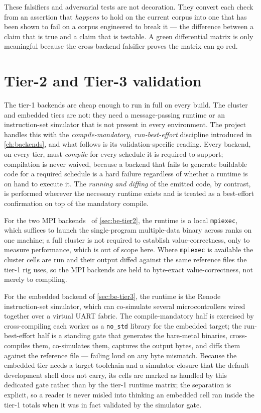 These falsifiers and adversarial tests are not decoration. They convert each check
from an assertion that \emph{happens} to hold on the current corpus into one that
has been shown to fail on a corpus engineered to break it --- the difference between
a claim that is true and a claim that is testable. A green differential matrix is
only meaningful because the cross-backend falsifier proves the matrix can go red.

\section{Tier-2 and Tier-3 validation}\label{sec:val-tiers}

The tier-1 backends are cheap enough to run in full on every build. The cluster and
embedded tiers are not: they need a message-passing runtime or an
instruction-set simulator that is not present in every environment. The project
handles this with the \emph{compile-mandatory, run-best-effort} discipline introduced
in \cref{ch:backends}, and what follows is its validation-specific reading.
Every backend, on every tier, must \emph{compile} for every schedule it is required
to support; compilation is never waived, because a backend that fails to generate
buildable code for a required schedule is a hard failure regardless of whether a
runtime is on hand to execute it. The \emph{running and diffing} of the emitted
code, by contrast, is performed wherever the necessary runtime exists and is
treated as a best-effort confirmation on top of the mandatory compile.

For the two MPI backends~\cite{mpiforum2021} of \cref{sec:be-tier2}, the runtime is
a local \texttt{mpiexec}, which suffices to launch the single-program
multiple-data binary across ranks on one machine; a full cluster is not required to
establish value-correctness, only to measure performance, which is out of scope
here. Where \texttt{mpiexec} is available the cluster cells are run and their output
diffed against the same reference files the tier-1 rig uses, so the MPI backends
are held to byte-exact value-correctness, not merely to compiling.

For the embedded backend of \cref{sec:be-tier3}, the runtime is the Renode
instruction-set simulator, which can co-simulate several microcontrollers wired
together over a virtual UART fabric. The compile-mandatory half is exercised by
cross-compiling each worker as a \texttt{no\_std} library for the embedded target;
the run-best-effort half is a standing gate that generates the bare-metal binaries,
cross-compiles them, co-simulates them, captures the output bytes, and diffs them
against the reference file --- failing loud on any byte mismatch. Because the
embedded tier needs a target toolchain and a simulator closure that the default
development shell does not carry, its cells are marked as handled by this dedicated
gate rather than by the tier-1 runtime matrix; the separation is explicit, so a
reader is never misled into thinking an embedded cell ran inside the tier-1 totals
when it was in fact validated by the simulator gate.


